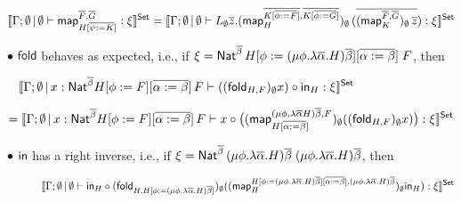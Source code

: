 \documentclass{lmcs}
\theoremstyle{plain}\newtheorem{satz}[thm]{Satz}
\newcommand{\fold}{\mathsf{fold}}
\newcommand{\map}{\mathsf{map}}
\begin{document}
{\vspace*{-0.08in}

\[\setsem{\Gamma; \emptyset \,|\, \emptyset \vdash
\map_{H[\ol{\psi := K}]}^{\ol{F}, \ol{G}} : \xi} = \setsem{\Gamma;
  \emptyset \,|\, \emptyset \vdash L_\emptyset \ol
  z. (\map_H^{\ol{K[\ol{\phi := F}]}, \ol{K[\ol{\phi :=
          G}]}})_\emptyset \,(\ol{(\map_K^{\ol{F}, \ol{G}})_\emptyset
    \, \ol z}) : \xi}\]

\vspace*{0.1in}

\noindent
$\bullet$\; $\fold$ behaves as expected, i.e., if $\xi =
\mathsf{Nat}^{\overline{\beta}}\, H[\phi :=
  (\mu \phi. \lambda
  \overline{\alpha}. H)\overline{\beta}][\overline{\alpha := \beta}]\;
F$, then

\vspace*{-0.05in}

\[\hspace*{-1in}\setsem{\Gamma; \emptyset \,|\, x:
  \Nat^{\overline{\beta}} H[\phi :=
    F][\overline{\alpha := \beta}]\, F \vdash ((\fold_{H,
    F})_{\emptyset} x) \circ \tin_{H} : \xi}\]

\vspace*{-0.15in}

\[= \setsem{ \Gamma; \emptyset \,|\, x: \Nat^{\overline{\beta}} H[\phi
    := F][\overline{\alpha := \beta}]\, F 
  \vdash x \circ \big( (\map_{H [\ol{\alpha := \beta}]}^{(\mu
    \phi. \lambda \overline{\alpha} H) \overline{\beta},
    F})_\emptyset ((\fold_{H, F})_{\emptyset} x) \big) : \xi}\]

\vspace*{0.1in}

\noindent
$\bullet$\; $\mathsf{in}$ has a right inverse, i.e., if $\xi =
\mathsf{Nat}^{\overline{\beta}}\, (\mu \phi. \lambda
\overline{\alpha}. H)\overline{\beta}\; (\mu \phi. \lambda
\overline{\alpha}. H)\overline{\beta}$, then

\vspace*{-0.05in}

\[\hspace*{0.43in}\setsem{\Gamma; \emptyset \,|\, \emptyset
  \vdash \tin_H \circ (\fold_{H, H[\phi := (\mu \phi. \lambda
      \overline{\alpha}. H)\overline{\beta}]})_{\emptyset}
  ((\map_{H}^{H[\phi := (\mu \phi. \lambda
      \overline{\alpha}. H)\overline{\beta}][\overline{\alpha :=
        \beta}], (\mu \phi. \lambda
    \overline{\alpha}. H)\overline{\beta}})_\emptyset \tin_H) :
  \xi}\]

\vspace*{-0.15in}

}
\end{document}
